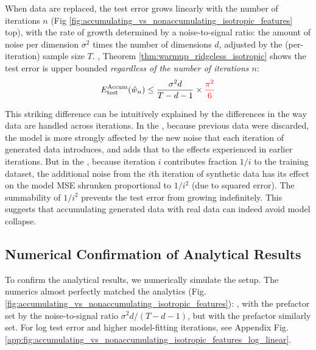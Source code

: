 When data are replaced, the test error grows linearly with the number of iterations $n$ (Fig \ref{fig:accumulating_vs_nonaccumulating_isotropic_features} top), with the rate of growth determined by a noise-to-signal ratio: the amount of noise per dimension $\sigma^2$ times the number of dimensions $d$, adjusted by the (per-iteration) sample size $T$. , Theorem \ref{thm:warmup_ridgeless_isotropic} shows the test error is upper bounded \textit{regardless of the number of iterations $n$}:
\begin{equation*}
E_{\text{test}}^{\text{Accum}}(\hat{w}_n) \leq \frac{\sigma^2 d}{T-d-1} \times \color{red}\frac{\pi^2}{6}\color{black}
\end{equation*}

This striking difference can be intuitively explained by the differences in the way data are handled across iterations. In the , because previous data were discarded, the model is more strongly affected by the new noise that each iteration of generated data introduces, and adds that to the effects experienced in earlier iterations. But in the , because iteration $i$ contributes fraction $1/i$ to the training dataset, the additional noise from the $i$th iteration of synthetic data has its effect on the model MSE shrunken proportional to $1/i^2$ (due to squared error). The summability of $1/i^2$ prevents the test error from growing indefinitely. This suggests that accumulating generated data with real data can indeed avoid model collapse.

\subsection{Numerical Confirmation of Analytical Results}

To confirm the analytical results, we numerically simulate the setup. The numerics almost perfectly matched the analytics (Fig. \ref{fig:accumulating_vs_nonaccumulating_isotropic_features}): , with the prefactor set by the noise-to-signal ratio $\sigma^2 d / (T - d -1)$, but  with the prefactor similarly set. For log test error and higher model-fitting iterations, see Appendix Fig. \ref{app:fig:accumulating_vs_nonaccumulating_isotropic_features_log_linear}.
